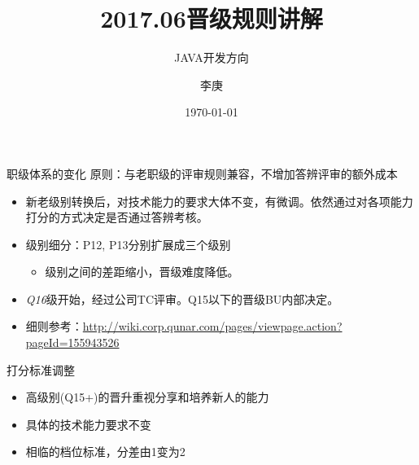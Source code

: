 \documentclass{beamer}
\begin{document}
\begin{CJK}{UTF8}{gbsn}

\title{2017.06晋级规则讲解}

\subtitle{JAVA开发方向}

\author{李庚}


\date{\today}

\begin{frame}
  \titlepage
\end{frame}

\begin{frame}{职级体系的变化}
  原则：与老职级的评审规则兼容，不增加答辨评审的额外成本
  \begin{itemize}
  \item {
    新老级别转换后，对技术能力的要求大体不变，有微调。依然通过对各项能力打分的方式决定是否通过答辨考核。
  }
  \item {
    级别细分：P12, P13分别扩展成三个级别
    \begin{itemize}
      \item { 级别之间的差距缩小，晋级难度降低。}
    \end{itemize}
  }
  \item { \emph{Q16}级开始，经过公司TC评审。Q15以下的晋级BU内部决定。}
  \item { 细则参考：\url{http://wiki.corp.qunar.com/pages/viewpage.action?pageId=155943526}}
  \end{itemize}

\end{frame}

\begin{frame}{打分标准调整}
  \begin{itemize}
  \item 高级别(Q15+)的晋升重视分享和培养新人的能力
  \item 具体的技术能力要求不变
  \item 相临的档位标准，分差由1变为2
  \end{itemize}
  
\end{frame}


\end{CJK}
\end{document}
